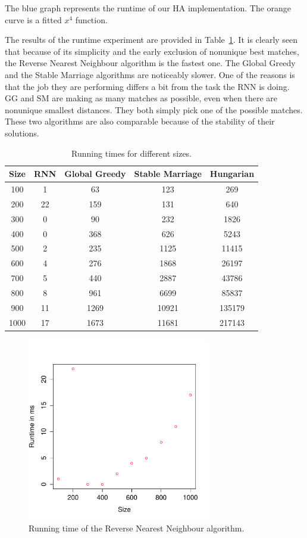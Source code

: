 \documentclass[a4paper,11pt]{article}
\begin{document}
The blue graph represents the runtime of our HA implementation. The orange curve is a fitted $x^4$ function.

The results of the runtime experiment are provided in Table~\ref{runtimes}. It is clearly seen that because of its simplicity and the early exclusion of nonunique best matches, the Reverse Nearest Neighbour algorithm is the fastest one. The Global Greedy and the Stable Marriage algorithms are noticeably slower. One of the reasons is that the job they are performing differs a bit from the task the RNN is doing. GG and SM are making as many matches as possible, even when there are nonunique smallest distances. They both simply pick one of the possible matches. These two algorithms are also comparable because of the stability of their solutions.

\begin{table}[tbh]
\centering
\begin{tabular}{|c|c|c|c|c|}
\hline 
Size & RNN & Global Greedy & Stable Marriage & Hungarian \tabularnewline
\hline 
\hline 
 100 & 1 & 63 & 123 & 269\tabularnewline
\hline
 200 & 22 & 159 & 131 & 640\tabularnewline
\hline 
 300 & 0 & 90 & 232 & 1826\tabularnewline
\hline 
 400 & 0 & 368 & 626 & 5243\tabularnewline
\hline 
 500 & 2 & 235 & 1125 & 11415\tabularnewline
\hline 
 600 & 4 & 276 & 1868 & 26197\tabularnewline
\hline 
 700 & 5 & 440 & 2887 & 43786\tabularnewline
\hline
 800 & 8 & 961 & 6699 & 85837\tabularnewline
\hline 
 900 & 11 & 1269 & 10921 & 135179\tabularnewline
\hline
 1000 & 17 & 1673 & 11681 & 217143\tabularnewline
\hline 
\end{tabular}
\caption{Running times for different sizes.}
\label{runtimes}
\end{table}

\begin{figure}[ht!]
\centering 
\includegraphics[width=8cm]{../graphs/rnn.pdf} 
\caption{Running time of the Reverse Nearest Neighbour algorithm.}
\label{rnn} 
\end{figure}
\end{document}

